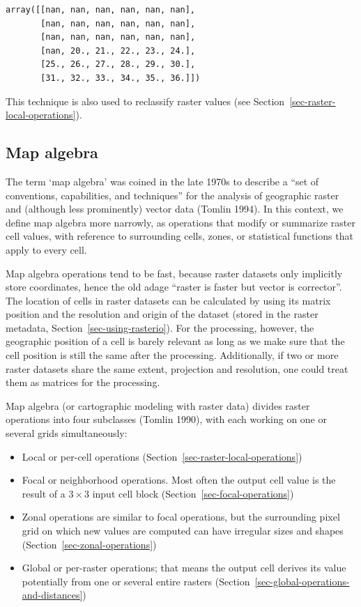 \documentclass[
  letterpaper,
]{krantz}
\providecommand{\tightlist}{%
  \setlength{\itemsep}{0pt}\setlength{\parskip}{0pt}}\usepackage{longtable,booktabs,array}
\begin{document}
\begin{verbatim}
array([[nan, nan, nan, nan, nan, nan],
       [nan, nan, nan, nan, nan, nan],
       [nan, nan, nan, nan, nan, nan],
       [nan, 20., 21., 22., 23., 24.],
       [25., 26., 27., 28., 29., 30.],
       [31., 32., 33., 34., 35., 36.]])
\end{verbatim}

This technique is also used to reclassify raster values (see
Section~\ref{sec-raster-local-operations}).

\subsection{Map algebra}\label{sec-map-algebra}

The term `map algebra' was coined in the late 1970s to describe a ``set
of conventions, capabilities, and techniques'' for the analysis of
geographic raster and (although less prominently) vector data (Tomlin
1994). In this context, we define map algebra more narrowly, as
operations that modify or summarize raster cell values, with reference
to surrounding cells, zones, or statistical functions that apply to
every cell.

Map algebra operations tend to be fast, because raster datasets only
implicitly store coordinates, hence the old adage ``raster is faster but
vector is corrector''. The location of cells in raster datasets can be
calculated by using its matrix position and the resolution and origin of
the dataset (stored in the raster metadata,
Section~\ref{sec-using-rasterio}). For the processing, however, the
geographic position of a cell is barely relevant as long as we make sure
that the cell position is still the same after the processing.
Additionally, if two or more raster datasets share the same extent,
projection and resolution, one could treat them as matrices for the
processing.

Map algebra (or cartographic modeling with raster data) divides raster
operations into four subclasses (Tomlin 1990), with each working on one
or several grids simultaneously:

\begin{itemize}
\tightlist
\item
  Local or per-cell operations
  (Section~\ref{sec-raster-local-operations})
\item
  Focal or neighborhood operations. Most often the output cell value is
  the result of a \(3 \times 3\) input cell block
  (Section~\ref{sec-focal-operations})
\item
  Zonal operations are similar to focal operations, but the surrounding
  pixel grid on which new values are computed can have irregular sizes
  and shapes (Section~\ref{sec-zonal-operations})
\item
  Global or per-raster operations; that means the output cell derives
  its value potentially from one or several entire rasters
  (Section~\ref{sec-global-operations-and-distances})
\end{itemize}
\end{document}
